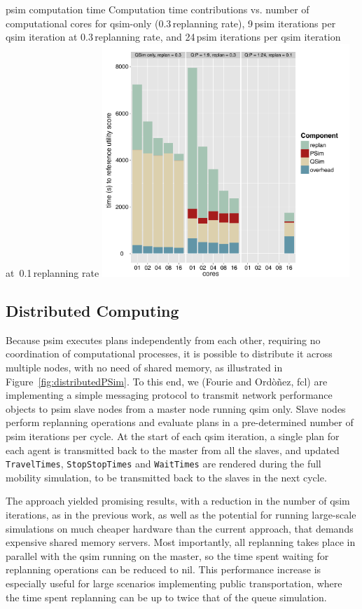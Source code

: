 \createfigure%
{\protect\gls{psim} computation time}%
{Computation time contributions vs. number of computational cores for \protect\gls{qsim}-only (0.3\,replanning rate), 9\,\gls{psim} iterations per \gls{qsim} iteration at 0.3\,replanning rate, and 24\,\gls{psim} iterations per \protect\gls{qsim} iteration at~0.1\,replanning rate}%
{\label{fig:PSimPerformance}}%
{\includegraphics[width=0.7\textwidth, angle=0]{extending/figures/PSim/times}}%
{}

\subsection{Distributed Computing}
Because \gls{psim} executes plans independently from each other, requiring no coordination of computational processes, it is possible to distribute it across multiple nodes, with no need of shared memory, as illustrated in Figure~\ref{fig:distributedPSim}. To this end, we (Fourie and Ord\`o\~nez, \gls{fcl}) are implementing a simple messaging protocol to transmit network performance objects to \gls{psim} slave nodes from a master node running \gls{qsim} only. Slave nodes perform replanning operations and evaluate plans in a pre-determined number of \gls{psim} iterations per cycle. At the start of each \gls{qsim} iteration, a single plan for each agent is transmitted back to the master from all the slaves, and updated \lstinline|TravelTimes|, \lstinline|StopStopTimes| and \lstinline|WaitTimes| are rendered during the full mobility simulation, to be transmitted back to the slaves in the next cycle.

The approach yielded promising results, with a reduction in the number of \gls{qsim} iterations, as in the previous work, as well as the potential for running large-scale simulations on much cheaper hardware than the current approach, that demands expensive shared memory servers. Most importantly, all replanning takes place in parallel with the \gls{qsim} running on the master, so the time spent waiting for replanning operations can be reduced to nil. This performance increase is especially useful for large scenarios implementing public transportation, where the time spent replanning can be up to twice that of the queue simulation.

